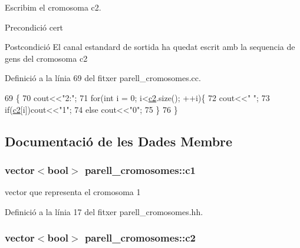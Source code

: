 Escribim el cromosoma c2. 

\begin{DoxyPrecond}{Precondició}
cert 
\end{DoxyPrecond}
\begin{DoxyPostcond}{Postcondició}
El canal estandard de sortida ha quedat escrit amb la sequencia de gens del cromosoma c2 
\end{DoxyPostcond}


Definició a la línia 69 del fitxer parell\+\_\+cromosomes.\+cc.


\begin{DoxyCode}
69                                    \{
70     cout<<\textcolor{stringliteral}{"2:"};
71     \textcolor{keywordflow}{for}(\textcolor{keywordtype}{int} i = 0; i<\hyperlink{classparell__cromosomes_a888f09ecbc3329b0ee505fb0cb8bf98f}{c2}.size(); ++i)\{
72         cout<<\textcolor{stringliteral}{" "};
73         \textcolor{keywordflow}{if}(\hyperlink{classparell__cromosomes_a888f09ecbc3329b0ee505fb0cb8bf98f}{c2}[i])cout<<\textcolor{stringliteral}{"1"};
74         \textcolor{keywordflow}{else} cout<<\textcolor{stringliteral}{"0"};
75     \}
76 \}
\end{DoxyCode}


\subsection{Documentació de les Dades Membre}
\subsubsection[{\texorpdfstring{c1}{c1}}]{\setlength{\rightskip}{0pt plus 5cm}vector$<$bool$>$ parell\+\_\+cromosomes\+::c1\hspace{0.3cm}{\ttfamily [private]}}\hypertarget{classparell__cromosomes_ab4d7cfc40f53a1698b4ea3ef1f2cd199}{}\label{classparell__cromosomes_ab4d7cfc40f53a1698b4ea3ef1f2cd199}


vector que representa el cromosoma 1 



Definició a la línia 17 del fitxer parell\+\_\+cromosomes.\+hh.

\subsubsection[{\texorpdfstring{c2}{c2}}]{\setlength{\rightskip}{0pt plus 5cm}vector$<$bool$>$ parell\+\_\+cromosomes\+::c2\hspace{0.3cm}{\ttfamily [private]}}\hypertarget{classparell__cromosomes_a888f09ecbc3329b0ee505fb0cb8bf98f}{}\label{classparell__cromosomes_a888f09ecbc3329b0ee505fb0cb8bf98f}


